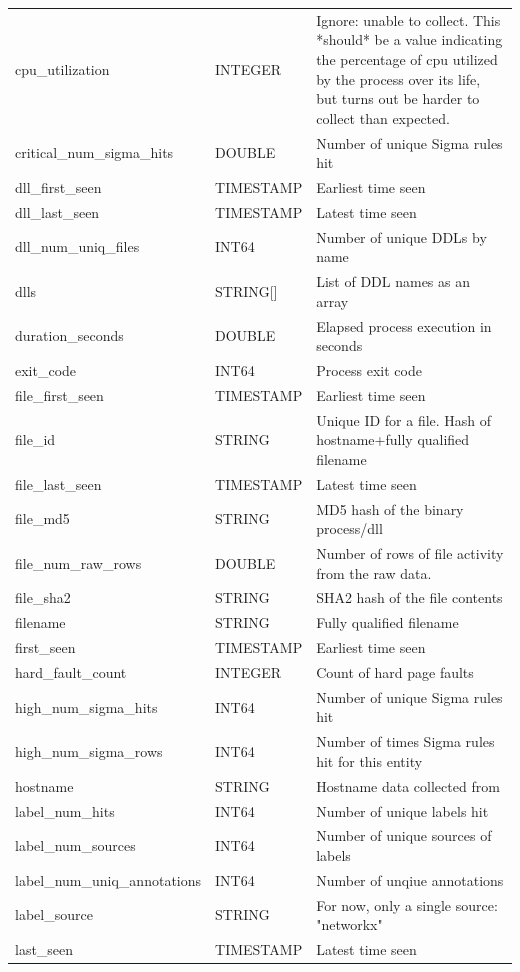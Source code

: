 \documentclass[conference,compsoc]{IEEEtran}
\begin{document}
\begin{longtable}{|p{5cm}|p{2cm}|p{9cm}|}
cpu\_utilization & INTEGER & Ignore: unable to collect. This *should* be a value indicating the percentage of cpu utilized by the process over its life, but turns out be harder to collect than expected. \\
critical\_num\_sigma\_hits & DOUBLE & Number of unique Sigma rules hit \\
dll\_first\_seen & TIMESTAMP & Earliest time seen \\
dll\_last\_seen & TIMESTAMP & Latest time seen \\
dll\_num\_uniq\_files & INT64 & Number of unique DDLs by name \\
dlls & STRING[] & List of DDL names as an array \\
duration\_seconds & DOUBLE & Elapsed process execution in seconds \\
exit\_code & INT64 & Process exit code \\
file\_first\_seen & TIMESTAMP & Earliest time seen \\
file\_id & STRING & Unique ID for a file. Hash of hostname+fully qualified filename \\
file\_last\_seen & TIMESTAMP & Latest time seen \\
file\_md5 & STRING & MD5 hash of the binary process/dll \\
file\_num\_raw\_rows & DOUBLE & Number of rows of file activity from the raw data. \\
file\_sha2 & STRING & SHA2 hash of the file contents \\
filename & STRING & Fully qualified filename \\
first\_seen & TIMESTAMP & Earliest time seen \\
hard\_fault\_count & INTEGER & Count of hard page faults \\
high\_num\_sigma\_hits & INT64 & Number of unique Sigma rules hit \\
high\_num\_sigma\_rows & INT64 & Number of times Sigma rules hit for this entity \\
hostname & STRING & Hostname data collected from \\
label\_num\_hits & INT64 & Number of unique labels hit \\
label\_num\_sources & INT64 & Number of unique sources of labels \\
label\_num\_uniq\_annotations & INT64 & Number of unqiue annotations \\
label\_source & STRING & For now, only a single source: "networkx" \\
last\_seen & TIMESTAMP & Latest time seen \\

\end{longtable}
\end{document}

